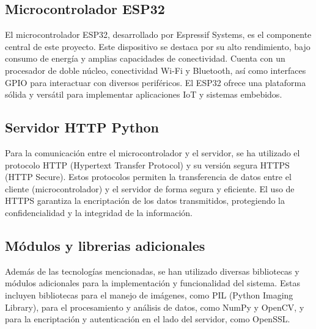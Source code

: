 \subsection{Microcontrolador ESP32}
El microcontrolador ESP32, desarrollado por Espressif Systems, es el componente central de este proyecto. Este dispositivo se destaca por su alto rendimiento, bajo consumo de energía y amplias capacidades de conectividad. Cuenta con un procesador de doble núcleo, conectividad Wi-Fi y Bluetooth, así como interfaces GPIO para interactuar con diversos periféricos. El ESP32 ofrece una plataforma sólida y versátil para implementar aplicaciones IoT y sistemas embebidos.

\subsection{Servidor HTTP Python}
Para la comunicación entre el microcontrolador y el servidor, se ha utilizado el protocolo HTTP (Hypertext Transfer Protocol) y su versión segura HTTPS (HTTP Secure). Estos protocolos permiten la transferencia de datos entre el cliente (microcontrolador) y el servidor de forma segura y eficiente. El uso de HTTPS garantiza la encriptación de los datos transmitidos, protegiendo la confidencialidad y la integridad de la información.

\subsection{Módulos y librerias adicionales}
Además de las tecnologías mencionadas, se han utilizado diversas bibliotecas y módulos adicionales para la implementación y funcionalidad del sistema. Estas incluyen bibliotecas para el manejo de imágenes, como PIL (Python Imaging Library), para el procesamiento y análisis de datos, como NumPy y OpenCV, y para la encriptación y autenticación en el lado del servidor, como OpenSSL.


